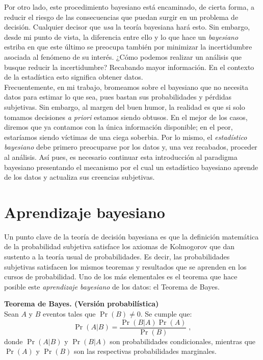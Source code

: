 Por otro lado, este procedimiento bayesiano está encaminado, de cierta forma, a reducir el riesgo de las consecuencias que puedan surgir en un problema de decisión. Cualquier decisor que \textit{usa} la teoría bayesiana hará esto. Sin embargo, desde mi punto de vista, la diferencia entre ello y lo que hace un \textit{bayesiano} estriba en que este último se preocupa también por minimizar la incertidumbre asociada al fenómeno de su interés. ¿Cómo podemos realizar un análisis que busque reducir la incertidumbre? Recabando mayor información. En el contexto de la estadística esto significa obtener datos.\\ 

Frecuentemente, en mi trabajo, bromeamos sobre el bayesiano que no necesita datos para estimar lo que sea, pues bastan sus probabilidades y pérdidas subjetivas. Sin embargo, al margen del buen humor, la realidad es que si solo tomamos decisiones \textit{a priori} estamos siendo obtusos. En el mejor de los casos, diremos que ya contamos con la única información disponible; en el peor, estaríamos siendo víctimas de una ciega soberbia. Por lo mismo, el \textit{estadístico bayesiano} debe primero preocuparse por los datos y, una vez recabados, proceder al análisis. Así pues, es necesario continuar esta introducción al paradigma bayesiano presentando el mecanismo por el cual un estadístico bayesiano aprende de los datos y actualiza sus creencias subjetivas.
	
\section{Aprendizaje bayesiano}

Un punto clave de la teoría de decisión bayesiana es que la definición matemática de la probabilidad subjetiva satisface los axiomas de Kolmogorov que dan sustento a la teoría usual de probabilidades. Es decir, las probabilidades subjetivas satisfacen los mismos teoremas y resultados que se aprenden en los cursos de probabilidad. Uno de los más elementales es el teorema que hace posible este \textit{aprendizaje bayesiano} de los datos: el Teorema de Bayes.

\begin{teo} \label{teo:Bayes_1}
\textbf{Teorema de Bayes. (Versión probabilística)}\\
Sean $A$ y $B$ eventos tales que $\Pr(B) \neq 0$. Se cumple que: 
\begin{equation*}
\Pr(A|B)=\dfrac{\Pr(B|A)\Pr(A)}{\Pr(B)}\;,
\end{equation*}
donde $\Pr(A|B)$ y $\Pr(B|A)$ son probabilidades condicionales, mientras que $\Pr(A)$ y $\Pr(B)$ son las respectivas probabilidades marginales. 
\end{teo}

